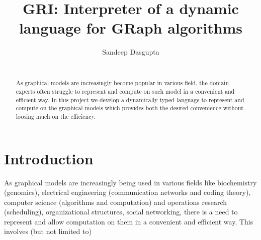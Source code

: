 \documentclass[letterpaper]{sig-alternate} \special{papersize=8.5in,11in}
\begin{document}
\title{GRI: Interpreter of a dynamic language for GRaph algorithms}

%
\author{
\alignauthor Sandeep Dasgupta\\ \\  } \date{}

\maketitle \begin{abstract} As graphical models are increasingly become popular
in various field, the domain experts often struggle to represent and compute on
such model in a convenient and efficient way. In this project we develop a
dynamically typed language to represent and compute on the graphical models
which provides both the desired convenience without loosing much on the
efficiency.  \end{abstract}


\section{Introduction}
As graphical models are increasingly being used in various fields like
biochemistry (genomics), electrical engineering (communication networks and
    coding theory), computer science (algorithms and computation) and
operations research (scheduling), organizational structures, social networking,
           there is a need to represent and allow computation on them in a
convenient and efficient way. This involves (but not limited to)
\end{document}
